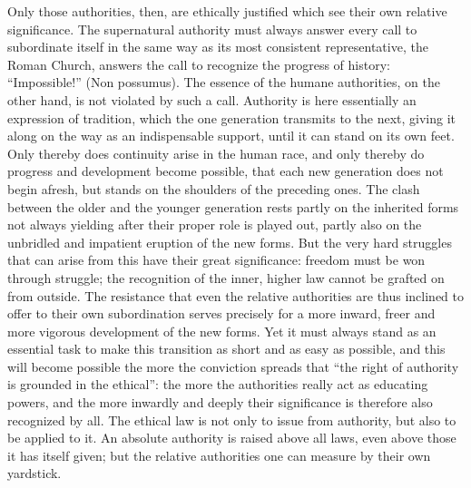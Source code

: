 \documentclass[12pt,a4paper,openany]{book}
\newcommand{\opage}[1]{\marginnote{\footnotesize\textit{[#1]}}}
\begin{document}
Only those authorities, then, are ethically justified which see their own
relative significance. The supernatural authority must always answer every
call to subordinate itself in the same way as its most consistent
representative, the Roman Church, answers the call to recognize the progress
of history: ``Impossible!'' (Non possumus). The essence of the humane
authorities, on the other hand, is not violated by such a call. Authority is
here essentially an expression of tradition, which the one generation
transmits to the next, giving it along on the way as an indispensable support,
until it can stand on its own feet. Only thereby does continuity arise in the
human race, and only thereby do progress and development become possible, that
each new generation does not begin \opage{79}afresh, but stands on the
shoulders of the preceding ones. The clash between the older and the younger
generation rests partly on the inherited forms not always yielding after their
proper role is played out, partly also on the unbridled and impatient eruption
of the new forms. But the very hard struggles that can arise from this have
their great significance: freedom must be won through struggle; the
recognition of the inner, higher law cannot be grafted on from outside. The
resistance that even the relative authorities are thus inclined to offer to
their own subordination serves precisely for a more inward, freer and more
vigorous development of the new forms. Yet it must always stand as an
essential task to make this transition as short and as easy as possible, and
this will become possible the more the conviction spreads that ``the right of
authority is grounded in the ethical'': the more the authorities really act as
educating powers, and the more inwardly and deeply their significance is
therefore also recognized by all. The ethical law is not only to issue from
authority, but also to be applied to it. An absolute authority is raised above
all laws, even above those it has itself given; but the relative authorities
one can measure by their own yardstick.
\end{document}
